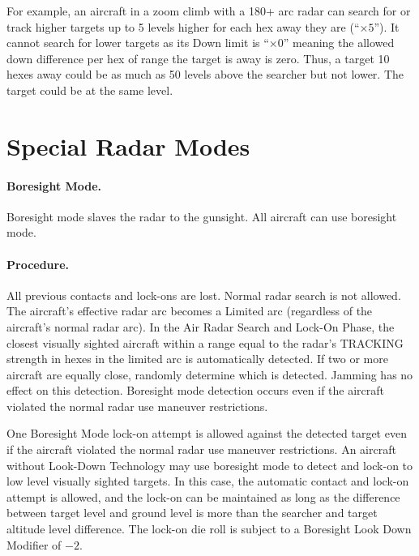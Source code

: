 {\begin{advancedrules}
For example, an aircraft in a zoom climb with a 180+ arc radar can search for or track higher targets up to 5 levels higher for each hex away they are (“$\times5$”). It cannot search for lower targets as its Down limit is “$\times0$” meaning the allowed down difference per hex of range the target is away is zero. Thus, a target 10 hexes away could be as much as 50 levels above the searcher but not lower. The target could be at the same level.

\section{Special Radar Modes}
\label{rule:special-radar-modes}

\paragraph{Boresight Mode.}\label{rule:boresight-mode} Boresight mode slaves the radar to the gunsight. All aircraft can use boresight mode.  

\paragraph{Procedure.}  All previous contacts and lock-ons are lost. Normal radar search is not allowed. The aircraft's effective radar arc becomes a Limited arc (regardless of the aircraft's normal radar arc). In the Air Radar Search and Lock-On Phase, the closest visually sighted aircraft within a range equal to the radar's TRACKING strength in hexes in the limited arc is automatically detected. If two or more aircraft are equally close, randomly determine which is detected. Jamming has no effect on this detection. Boresight mode detection occurs even if the aircraft violated the normal radar use maneuver restrictions.

One Boresight Mode lock-on attempt is allowed against the detected target even if the aircraft violated the normal radar use maneuver restrictions. An aircraft without Look-Down Technology may use boresight mode to detect and lock-on to low level visually sighted targets. In this case, the automatic contact and lock-on attempt is allowed, and the lock-on can be maintained as long as the difference between target level and ground level is more than the searcher and target altitude level difference. The lock-on die roll is subject to a Boresight Look Down Modifier of $-2$. 


\end{advancedrules}}
